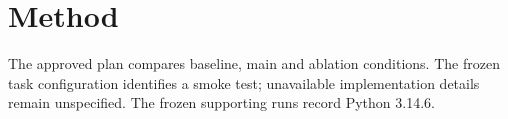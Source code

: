\section{Method}
The approved plan compares baseline, main and ablation conditions. The frozen task configuration identifies a smoke test; unavailable implementation details remain unspecified. The frozen supporting runs record Python 3.14.6.
